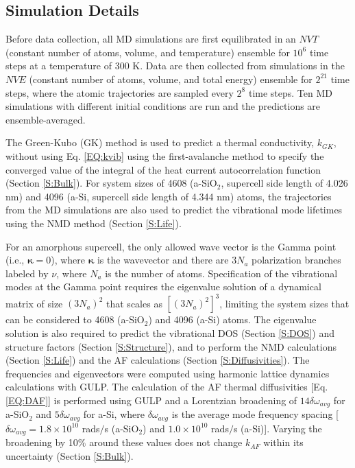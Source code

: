 \documentclass[aps,prb,twocolumn,superscriptaddress,footinbib,amsmath,amssymb,floatfix]{revtex4}
\begin{document}
\subsection{\label{S:Simulation}Simulation Details}

Before data collection, all MD simulations are first equilibrated in an 
$NVT$ (constant number of atoms, volume, and temperature) ensemble for 
$10^6$ time steps at a temperature of 300 K. Data are then collected from 
simulations in the $NVE$ (constant number of atoms, volume, and total
energy) ensemble 
for $2^{21}$ time steps, where the atomic trajectories are sampled 
every $2^{8}$ time steps. Ten MD simulations with different initial 
conditions are run and the predictions are ensemble-averaged. 

The Green-Kubo (GK) method\cite{mcquarrie_statistical_2000} 
is used to predict a thermal conductivity, $k_{GK}$, 
without using Eq. \eqref{EQ:kvib} using the 
first-avalanche method to specify the converged value of the integral 
of the heat current autocorrelation function (Section \ref{S:Bulk}).
\cite{chen_how_2010} 
For system sizes of 4608 (a-SiO$_2$, supercell side length of 4.026 nm) 
and 4096 (a-Si, supercell side length of 4.344 nm) atoms, 
the trajectories from the MD simulations are also used to predict 
the vibrational mode lifetimes using the NMD method 
(Section \ref{S:Life}). 

For an amorphous supercell, 
the only allowed wave vector is the Gamma point 
(i.e., $\pmb{\kappa}=0$),  
where $\pmb{\kappa}$ is the wavevector and there are $3N_a$ 
polarization 
branches labeled by $\nu$, where $N_a$ is the number of atoms. 
Specification of the vibrational modes at the Gamma point  
requires the eigenvalue solution of a dynamical matrix of size 
$(3N_a)^2$ that scales as $[(3N_a)^2]^3$, limiting the system 
sizes that can be considered to 4608 (a-SiO$_2$) and 4096 (a-Si) 
atoms. 
The eigenvalue solution is also required to predict the vibrational 
DOS (Section \ref{S:DOS}) and structure factors 
(Section \ref{S:Structure}), and to perform the NMD calculations  
(Section \ref{S:Life})  
and the AF calculations (Section \ref{S:Diffusivities}). 
The frequencies and eigenvectors were computed using harmonic
lattice dynamics calculations with GULP.\cite{gale_general_2003} 
The calculation of the AF thermal diffusivities 
[Eq. \eqref{EQ:DAF}] is performed using GULP and a Lorentzian 
broadening of $14\delta\omega_{avg}$ for a-SiO$_2$ and 
$5\delta\omega_{avg}$ for a-Si, 
where $\delta\omega_{avg}$ is the average mode 
frequency spacing 
[$\delta\omega_{avg} = 1.8 \times 10^{10}$ rads$/$s (a-SiO$_2$) 
and $1.0 \times 10^{10}$ rads$/$s (a-Si)].   
Varying the broadening by 10$\%$ around these values does not 
change $k_{AF}$ within its uncertainty 
(Section \ref{S:Bulk}).
\end{document}
